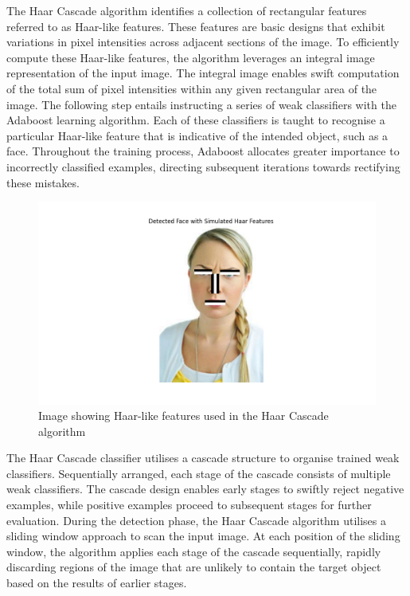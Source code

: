 The Haar Cascade algorithm identifies a collection of rectangular features referred to as Haar-like features. These features are basic designs that exhibit variations in pixel intensities across adjacent sections of the image. To efficiently compute these Haar-like features, the algorithm leverages an integral image representation of the input image. The integral image enables swift computation of the total sum of pixel intensities within any given rectangular area of the image.
The following step entails instructing a series of weak classifiers with the Adaboost learning algorithm. Each of these classifiers is taught to recognise a particular Haar-like feature that is indicative of the intended object, such as a face. Throughout the training process, Adaboost allocates greater importance to incorrectly classified examples, directing subsequent iterations towards rectifying these mistakes.
\begin{figure}[!htb]
    \centering{}
    \includegraphics[scale=0.5]{m+m_images/HaarFeatures.png}
    \caption{Image showing Haar-like features used in the Haar Cascade algorithm}
    \label{figure:haarfeature}
\end{figure}

The Haar Cascade classifier utilises a cascade structure to organise trained weak classifiers. Sequentially arranged, each stage of the cascade consists of multiple weak classifiers. The cascade design enables early stages to swiftly reject negative examples, while positive examples proceed to subsequent stages for further evaluation. During the detection phase, the Haar Cascade algorithm utilises a sliding window approach to scan the input image. At each position of the sliding window, the algorithm applies each stage of the cascade sequentially, rapidly discarding regions of the image that are unlikely to contain the target object based on the results of earlier stages.

